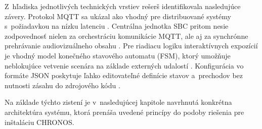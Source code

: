 Z~hľadiska jednotlivých technických vrstiev rešerš
identifikovala nasledujúce závery. Protokol MQTT sa ukázal
ako vhodný pre distribuované systémy
s~požiadavkou na nízku latenciu \cite{mqtt_websocket_comparison}.
Centrálna jednotka SBC pritom nesie zodpovednosť nielen za
orchestráciu komunikácie MQTT, ale aj za synchrónne prehrávanie
audiovizuálneho obsahu \cite{rpi4_datasheet}. Pre riadiacu
logiku interaktívnych expozícií je vhodný model konečného
stavového automatu (FSM), ktorý umožňuje neblokujúce
vetvenie scenára na základe externých udalostí
\cite{distributed_control_modeling}. Konfigurácia vo
formáte JSON poskytuje ľahko editovateľné definície stavov
a~prechodov bez nutnosti zásahu do zdrojového kódu \cite{iot_data_formats_review}.

Na základe týchto zistení je v~nasledujúcej kapitole navrhnutá
konkrétna architektúra systému, ktorá prenáša uvedené princípy
do podoby riešenia pre inštaláciu CHRONOS.
